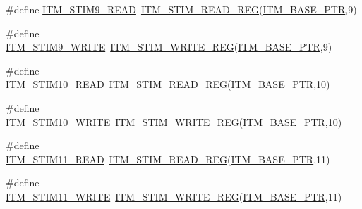 \begin{DoxyCompactItemize}
\item 
\#define \hyperlink{group___i_t_m___register___accessor___macros_ga1c080ae3f53ea5063b86fd6fe6ba264d}{I\+T\+M\+\_\+\+S\+T\+I\+M9\+\_\+\+R\+E\+AD}~\hyperlink{group___i_t_m___register___accessor___macros_ga5009882336aadcd4f37b45cf3395c450}{I\+T\+M\+\_\+\+S\+T\+I\+M\+\_\+\+R\+E\+A\+D\+\_\+\+R\+EG}(\hyperlink{group___i_t_m___peripheral_gafaddee8fe8b6a898d4e5edc43ee0d703}{I\+T\+M\+\_\+\+B\+A\+S\+E\+\_\+\+P\+TR},9)
\item 
\#define \hyperlink{group___i_t_m___register___accessor___macros_gaff1a7b2832a1e4ecef1e171dd126fc48}{I\+T\+M\+\_\+\+S\+T\+I\+M9\+\_\+\+W\+R\+I\+TE}~\hyperlink{group___i_t_m___register___accessor___macros_ga049ca92a4e78e77c19af81e51aa73f1c}{I\+T\+M\+\_\+\+S\+T\+I\+M\+\_\+\+W\+R\+I\+T\+E\+\_\+\+R\+EG}(\hyperlink{group___i_t_m___peripheral_gafaddee8fe8b6a898d4e5edc43ee0d703}{I\+T\+M\+\_\+\+B\+A\+S\+E\+\_\+\+P\+TR},9)
\item 
\#define \hyperlink{group___i_t_m___register___accessor___macros_gac52c9a2197fa51dd2395e68ce8f77f21}{I\+T\+M\+\_\+\+S\+T\+I\+M10\+\_\+\+R\+E\+AD}~\hyperlink{group___i_t_m___register___accessor___macros_ga5009882336aadcd4f37b45cf3395c450}{I\+T\+M\+\_\+\+S\+T\+I\+M\+\_\+\+R\+E\+A\+D\+\_\+\+R\+EG}(\hyperlink{group___i_t_m___peripheral_gafaddee8fe8b6a898d4e5edc43ee0d703}{I\+T\+M\+\_\+\+B\+A\+S\+E\+\_\+\+P\+TR},10)
\item 
\#define \hyperlink{group___i_t_m___register___accessor___macros_ga777b8d32021dcda309623609448e4042}{I\+T\+M\+\_\+\+S\+T\+I\+M10\+\_\+\+W\+R\+I\+TE}~\hyperlink{group___i_t_m___register___accessor___macros_ga049ca92a4e78e77c19af81e51aa73f1c}{I\+T\+M\+\_\+\+S\+T\+I\+M\+\_\+\+W\+R\+I\+T\+E\+\_\+\+R\+EG}(\hyperlink{group___i_t_m___peripheral_gafaddee8fe8b6a898d4e5edc43ee0d703}{I\+T\+M\+\_\+\+B\+A\+S\+E\+\_\+\+P\+TR},10)
\item 
\#define \hyperlink{group___i_t_m___register___accessor___macros_ga0303347d6234c6044d64450073e3111d}{I\+T\+M\+\_\+\+S\+T\+I\+M11\+\_\+\+R\+E\+AD}~\hyperlink{group___i_t_m___register___accessor___macros_ga5009882336aadcd4f37b45cf3395c450}{I\+T\+M\+\_\+\+S\+T\+I\+M\+\_\+\+R\+E\+A\+D\+\_\+\+R\+EG}(\hyperlink{group___i_t_m___peripheral_gafaddee8fe8b6a898d4e5edc43ee0d703}{I\+T\+M\+\_\+\+B\+A\+S\+E\+\_\+\+P\+TR},11)
\item 
\#define \hyperlink{group___i_t_m___register___accessor___macros_ga2b6f1a25e7ac17786baf3b401c94a1d9}{I\+T\+M\+\_\+\+S\+T\+I\+M11\+\_\+\+W\+R\+I\+TE}~\hyperlink{group___i_t_m___register___accessor___macros_ga049ca92a4e78e77c19af81e51aa73f1c}{I\+T\+M\+\_\+\+S\+T\+I\+M\+\_\+\+W\+R\+I\+T\+E\+\_\+\+R\+EG}(\hyperlink{group___i_t_m___peripheral_gafaddee8fe8b6a898d4e5edc43ee0d703}{I\+T\+M\+\_\+\+B\+A\+S\+E\+\_\+\+P\+TR},11)

\end{DoxyCompactItemize}
